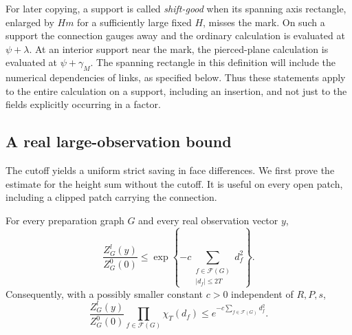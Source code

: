 For later copying, a support is called \emph{shift-good} when its spanning
axis rectangle, enlarged by $Hm$ for a sufficiently large fixed $H$,
misses the mark.  On such a support the connection gauges away and the
ordinary calculation is evaluated at $\psi+\lambda$.  At an interior
support near the mark, the pierced-plane calculation is evaluated at
$\psi+\gamma_M$.  The spanning rectangle in this definition will include
the numerical dependencies of links, as specified below.  Thus these
statements apply to the entire calculation on a support, including an
insertion, and not just to the fields explicitly occurring in a factor.

\subsection{A real large-observation bound}
\label{prep:large-observations}

The cutoff yields a uniform strict saving in face differences.  We first
prove the estimate for the height sum without the cutoff.  It is useful
on every open patch, including a clipped patch carrying the connection.

\begin{lemma}\label{prep:large-field}
For every preparation graph $G$ and every real observation vector $y$,
\begin{equation}\label{eq:large-observation}
 \frac{Z_G^l(y)}{Z_G^0(0)}
       \le\exp\left\{-c\sum_{\substack{f\in\mathcal F(G)\\|d_f|\le2T}}
                                                    d_f^2\right\}.
\end{equation}
Consequently, with a possibly smaller constant $c>0$ independent of
$R,P,s$,
\begin{equation}\label{prep:face-saving}
 \frac{Z_G^l(y)}{Z_G^0(0)}
             \prod_{f\in\mathcal F(G)}\chi_T(d_f)
                  \le e^{-c\sum_{f\in\mathcal F(G)}d_f^2}.
\end{equation}
\end{lemma}

